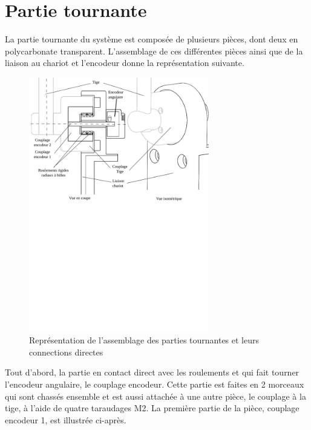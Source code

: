 \section{Partie tournante}\label{sec:PartieTour}
La partie tournante du système est composée de plusieurs pièces, dont deux en polycarbonate transparent. L'assemblage de ces différentes pièces ainsi que de
la liaison au chariot et l'encodeur donne la représentation suivante.

\begin{figure}[H]
    \centering
    \includegraphics[width = 0.7\textwidth]{assets/figures/AssemblagePartieTournante.svg}
    \caption{Représentation de l'assemblage des parties tournantes et leurs connections directes}
    \label{fig:AssPartieTour}
\end{figure}

Tout d'abord, la partie en contact direct avec les roulements et qui fait tourner l'encodeur angulaire, le couplage encodeur. Cette partie est
faites en 2 morceaux qui sont chassés ensemble et est aussi attachée à une autre pièce, le couplage à la tige, à l'aide de quatre taraudages M2.
La première partie de la pièce, couplage encodeur 1, est illustrée ci-après.

